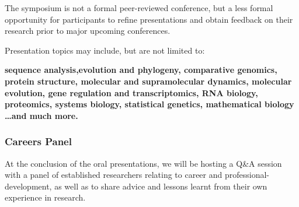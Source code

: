 \documentclass[10pt,]{article}
\begin{document}
The symposium is not a formal peer-reviewed conference, but a less formal
opportunity for participants to refine presentations and obtain feedback on
their research prior to major upcoming conferences.

Presentation topics may include, but are not limited to:\par

\begin{minipage}[c]{\linewidth}
    \centering
    \begin{varwidth}[c]{\linewidth}
        \raggedright
        \bfseries
        sequence analysis,evolution and phylogeny, comparative genomics, protein
        structure, molecular and supramolecular dynamics, molecular evolution, gene
        regulation and transcriptomics, RNA biology, proteomics, systems biology,
        statistical genetics, mathematical biology \normalfont\ldots and much more.
        \end{varwidth}
\end{minipage}\par\bigskip



\subsubsection{Careers Panel}

At the conclusion of the oral presentations, we will be hosting a Q\&A
session with a panel of established researchers
relating to career and professional-development, as well as to share
advice and lessons learnt from their own experience in research.
\end{document}
